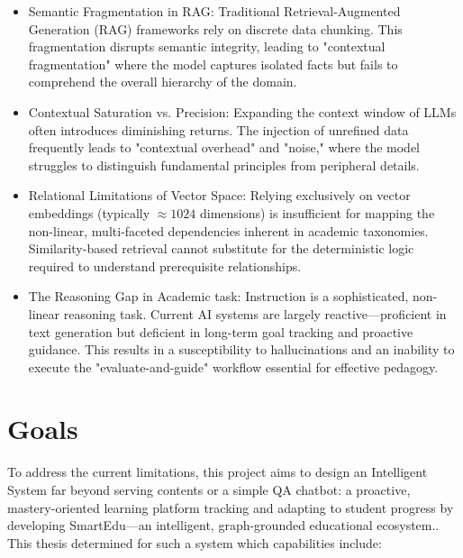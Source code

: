 \begin{itemize}
    \item {Semantic Fragmentation in RAG:} Traditional Retrieval-Augmented Generation (RAG) frameworks rely on discrete data chunking. 
    This fragmentation disrupts semantic integrity, leading to "contextual fragmentation" where the model captures isolated facts but fails to comprehend the 
    overall hierarchy of the domain.
    \item {Contextual Saturation vs. Precision:} Expanding the context window of LLMs often introduces diminishing returns. The injection of unrefined data frequently 
    leads to "contextual overhead" and "noise," where the model struggles to distinguish fundamental principles from peripheral details.
    \item {Relational Limitations of Vector Space:} Relying exclusively on vector embeddings (typically $\approx 1024$ dimensions) is insufficient for mapping the 
    non-linear, multi-faceted dependencies inherent in academic taxonomies. Similarity-based retrieval cannot substitute for the deterministic logic required to 
    understand prerequisite relationships.
    \item {The Reasoning Gap in Academic task:} Instruction is a sophisticated, non-linear reasoning task. Current AI systems are largely reactive—proficient in 
    text generation but deficient in long-term goal tracking and proactive guidance. This results in a susceptibility to hallucinations and an inability to execute 
    the "evaluate-and-guide" workflow essential for effective pedagogy.
\end{itemize}

\section{Goals}\label{sec:goal}

To address the current limitations, this project aims to design an Intelligent System far beyond serving contents or a simple QA chatbot: a proactive, mastery-oriented 
learning platform tracking and adapting to student progress by developing {SmartEdu}—an intelligent, graph-grounded 
educational ecosystem.. This thesis determined for such a system which capabilities include:

